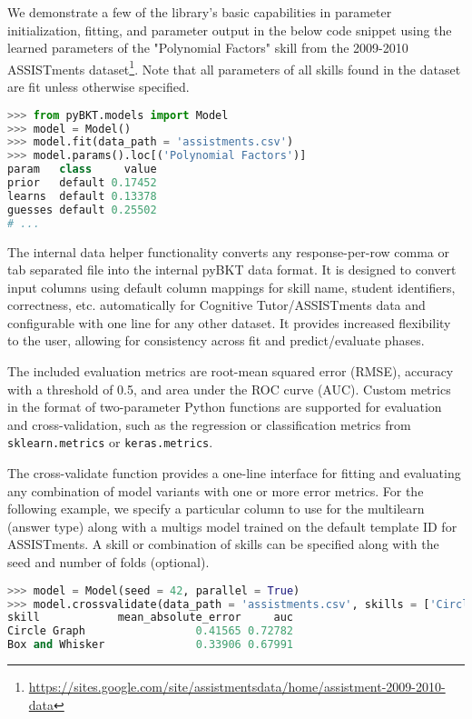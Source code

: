 \documentclass{edm_article}
\begin{document}
We demonstrate a few of the library's basic capabilities in parameter initialization, fitting, and parameter output in the below code snippet using the learned parameters of the "Polynomial Factors" skill from the 2009-2010 ASSISTments dataset\footnote{\url{https://sites.google.com/site/assistmentsdata/home/assistment-2009-2010-data}}. Note that all parameters of all skills found in the dataset are fit unless otherwise specified.

\begin{lstlisting}[language=Python, breaklines=true, showstringspaces=false, columns=flexible, tabsize = 12]
>>> from pyBKT.models import Model
>>> model = Model()
>>> model.fit(data_path = 'assistments.csv')
>>> model.params().loc[('Polynomial Factors')]
param   class     value
prior   default 0.17452
learns  default 0.13378
guesses default 0.25502
# ...
\end{lstlisting}

The internal data helper functionality converts any response-per-row comma or tab separated file into the internal pyBKT data format. It is designed to convert input columns using default column mappings for skill name, student identifiers, correctness, etc. automatically for Cognitive Tutor/ASSISTments data and configurable with one line for any other dataset. It provides increased flexibility to the user, allowing for consistency across fit and predict/evaluate phases.

The included evaluation metrics are root-mean squared error (RMSE), accuracy with a threshold of 0.5, and area under the ROC curve (AUC). Custom metrics in the format of two-parameter Python functions are supported for evaluation and cross-validation, such as the regression or classification metrics from \verb+sklearn.metrics+ or \verb+keras.metrics+.

The cross-validate function provides a one-line interface for fitting and evaluating any combination of model variants with one or more error metrics. For the following example, we specify a particular column to use for the multilearn (answer type) along with a multigs model trained on the default template ID for ASSISTments. A skill or combination of skills can be specified along with the seed and number of folds (optional). 

\begin{lstlisting}[language=Python, breaklines=true, showstringspaces=false, columns=flexible, tabsize = 12]
>>> model = Model(seed = 42, parallel = True)
>>> model.crossvalidate(data_path = 'assistments.csv', skills = ['Circle Graph', 'Box and Whisker'], multigs = True, multilearn = 'answer_type', metric = ['auc', sklearn.metrics.mean_absolute_error])
skill            mean_absolute_error     auc                                       
Circle Graph                 0.41565 0.72782
Box and Whisker              0.33906 0.67991
\end{lstlisting}
\end{document}

